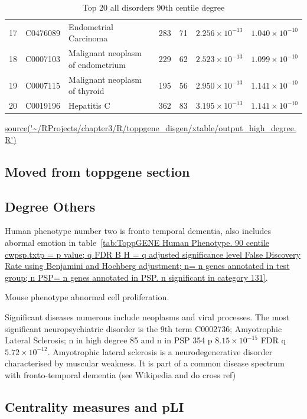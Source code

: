 \begin{table}[ht]
\begin{adjustbox}{width=\textwidth}
\begin{tabular}{lllllll}
  17 & C0476089 & Endometrial Carcinoma & 283 & 71 & $2.256 \times 10^{-13}$ & $1.040 \times 10^{-10}$ \\ 
  18 & C0007103 & Malignant neoplasm of endometrium & 229 & 62 & $2.523 \times 10^{-13}$ & $1.099 \times 10^{-10}$ \\ 
  19 & C0007115 & Malignant neoplasm of thyroid & 195 & 56 & $2.950 \times 10^{-13}$ & $1.141 \times 10^{-10}$ \\ 
  20 & C0019196 & Hepatitis C & 362 & 83 & $3.195 \times 10^{-13}$ & $1.141 \times 10^{-10}$ \\ 
   \hline
\end{tabular}
\end{adjustbox}
\caption{Top 20 all disorders 90th centile degree} 
\tiny\url{source('~/RProjects/chapter3/R/toppgene_disgen/xtable/output_high_degree.R')}
\end{table}

\subsection{Moved from toppgene section}
\subsection{Degree Others}
Human phenotype number two is fronto temporal dementia, also includes abormal emotion in table~\ref{tab:ToppGENE Human Phenotype. 90 centile cwpsp.txtp = p value; q FDR B H = q adjusted significance level False Discovery Rate using Benjamini and Hochberg adjustment; n= n genes annotated in test group; n PSP= n genes annotated in PSP. n significant in category 131}.

Mouse phenotype abnormal cell proliferation.

Significant diseases numerous include neoplasms and viral processes. The most significant neuropsychiatric disorder is the 9th term C0002736;  Amyotrophic Lateral Sclerosis; n in high degree 85 and n in PSP 354 p $8.15 \times 10^{-15}$ FDR q $5.72 \times 10^{-12}$. Amyotrophic lateral sclerosis is a neurodegenerative disorder characterised by muscular weakness. It is part of a common disease spectrum with fronto-temporal dementia (see Wikipedia and do cross ref) 





\clearpage

\subsection{Centrality measures and pLI}

